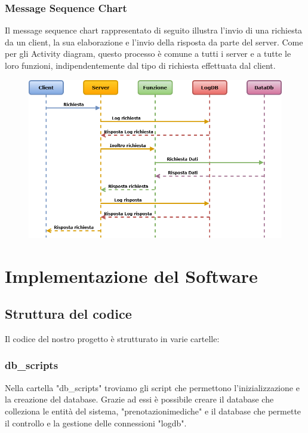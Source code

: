 \documentclass[12pt]{report}
\begin{document}
    \subsection{Message Sequence Chart}
    Il message sequence chart rappresentato di seguito illustra l'invio di una richiesta da un client, la sua elaborazione e l'invio della risposta da parte del server. Come per gli Activity diagram, questo processo è comune a tutti i server e a tutte le loro funzioni, indipendentemente dal tipo di richiesta effettuata dal client. 
    \begin{figure}[H]
        \centering
        \includegraphics[width=1\linewidth]{images/MessageFlowChart.png}
        \label{Messageflowchart}
    \end{figure}
    

    \chapter{Implementazione del Software}
    
    \section{Struttura del codice}

    Il codice del nostro progetto è strutturato in varie cartelle:
    \subsection{db\_scripts}
    Nella cartella "db\_scripts" troviamo gli script che permettono l'inizializzazione e la creazione del database. Grazie ad essi è possibile creare il database che colleziona le entità del sistema, "prenotazionimediche" e il database che permette il controllo e la gestione delle connessioni "logdb".
\end{document}
